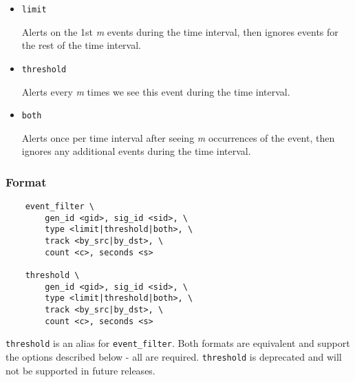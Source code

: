 \documentclass[english]{report}
\begin{document}
\begin{itemize} 
\item \texttt{limit} 

Alerts on the 1st \textit{m} events during the time interval, then ignores
events for the rest of the time interval.

\item \texttt{threshold} 

Alerts every \textit{m} times we see this event during the time interval.

\item \texttt{both} 

Alerts once per time interval after seeing \textit{m} occurrences of the event,
then ignores any additional events during the time interval.

\end{itemize}

\subsubsection{Format}

\begin{verbatim}
    event_filter \
        gen_id <gid>, sig_id <sid>, \
        type <limit|threshold|both>, \
        track <by_src|by_dst>, \
        count <c>, seconds <s>  

    threshold \
        gen_id <gid>, sig_id <sid>, \
        type <limit|threshold|both>, \
        track <by_src|by_dst>, \
        count <c>, seconds <s>  
\end{verbatim}

\texttt{threshold} is an alias for \texttt{event\_filter}.  Both formats are
equivalent and support the options described below - all are required.
\texttt{threshold} is deprecated and will not be supported in future releases.
\end{document}
